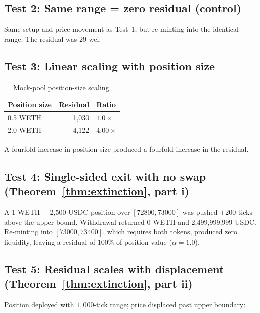 \documentclass[11pt,a4paper]{article}
\theoremstyle{plain}
\begin{document}
\subsection{Test 2: Same range = zero residual (control)}\label{sec:foundry-mock-control}

Same setup and price movement as Test~1, but re-minting into the identical range. The residual was 29 wei.

\subsection{Test 3: Linear scaling with position size}\label{sec:foundry-mock-scaling}

\begin{table}[H]
\centering
\caption{Mock-pool position-size scaling.}
\label{tab:foundry-scaling}
\begin{tabular}{@{}lrl@{}}
\toprule
Position size & Residual & Ratio \\
\midrule
0.5 WETH & 1{,}030 & $1.0\times$ \\
2.0 WETH & 4{,}122 & $4.00\times$ \\
\bottomrule
\end{tabular}
\end{table}

\noindent A fourfold increase in position size produced a fourfold increase in the residual.

\subsection{Test 4: Single-sided exit with no swap (Theorem~\ref{thm:extinction}, part i)}\label{sec:foundry-mock-extinction}

A 1 WETH $+$ 2{,}500 USDC position over $[72800, 73000]$ was pushed $+200$ ticks above the upper bound. Withdrawal returned 0 WETH and 2{,}499{,}999{,}999 USDC. Re-minting into $[73000, 73400]$, which requires both tokens, produced zero liquidity, leaving a residual of $100\%$ of position value ($\alpha = 1.0$).

\subsection{Test 5: Residual scales with displacement (Theorem~\ref{thm:extinction}, part ii)}\label{sec:foundry-displacement}

Position deployed with $1{,}000$-tick range; price displaced past upper boundary:
\end{document}
